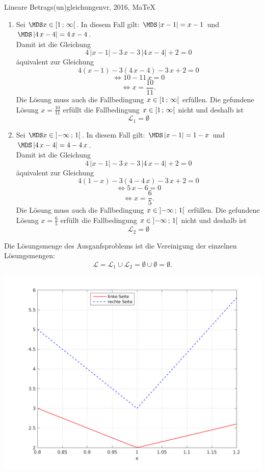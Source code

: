 \begin{MAufgabe}{Lineare Betrags(un)gleichungen}{vr, 2016, MaTeX}
 \begin{enumerate} 
 \item Sei $ \MDS x\in[ 1 \, \MIntvlSep \, \infty\MoIr $. 
 In diesem Fall gilt: 
  $ \MDS \left| x - 1\right|=x - 1$ und $ \MDS \left| 4\, x - 4\right|=4\, x - 4$. \\ 
 Damit ist die Gleichung 
 $$ 
4\, \left|x - 1\right| - 3\, x - 3\, \left|4\, x - 4\right| + 2= 0
$$
 \"aquivalent zur Gleichung
 $$ 
4\left(x - 1\right)-3\left( 4\, x - 4\right)- 3\, x+2= 0 
$$  
$$ 
 \Leftrightarrow 10 - 11\, x= 0 
$$  
$$ \Leftrightarrow x = \frac{10}{11} . 
 $$ 
 Die L\"osung muss auch die Fallbedingung $x\in [ 1 \, ; \, \infty[\mbox{}  $ erf\"ullen. Die gefundene L\"osung $x=\frac{10}{11}$ erf\"ullt die Fallbedingung  $x\in [ 1 \, ; \, \infty[\mbox{} $ nicht und deshalb ist  $$
 \mathcal{L}_{1}=\emptyset 
 $$ 
\item Sei $ \MDS x\in\MoIl  -\infty \, \MIntvlSep \, 1\MoIr $. 
 In diesem Fall gilt: 
  $ \MDS \left| x - 1\right|=1 - x$ und $ \MDS \left| 4\, x - 4\right|=4 - 4\, x$. \\ 
 Damit ist die Gleichung 
 $$ 
4\, \left|x - 1\right| - 3\, x - 3\, \left|4\, x - 4\right| + 2= 0
$$
 \"aquivalent zur Gleichung
 $$ 
4\left(1 - x\right)-3\left( 4 - 4\, x\right)- 3\, x+2= 0 
$$  
$$ 
 \Leftrightarrow 5\, x - 6= 0 
$$  
$$ \Leftrightarrow x = \frac{6}{5} . 
 $$ 
 Die L\"osung muss auch die Fallbedingung $x\in \mbox{}]\mathopen{}  -\infty \, ; \, 1[\mbox{}  $ erf\"ullen. Die gefundene L\"osung $x=\frac{6}{5}$ erf\"ullt die Fallbedingung  $x\in \mbox{}]\mathopen{}  -\infty \, ; \, 1[\mbox{} $ nicht und deshalb ist  $$
 \mathcal{L}_{2}=\emptyset 
 $$ 
 \end{enumerate} 
  Die L\"osungsmenge des Ausganfsproblems ist die Vereinigung der einzelnen L\"osungsmengen: 
$$ \mathcal{L} = \mathcal{L}_{1} \cup \mathcal{L}_{2} 
 = \emptyset\cup \emptyset 
   =\emptyset 
   . $$ 
 
 \begin{center}
 \includegraphics[width=0.8\linewidth]{Abb_zur_Ag_autogenerated_abs_3.png} \end{center}
 
\else\relax\fi
 \end{MAufgabe}